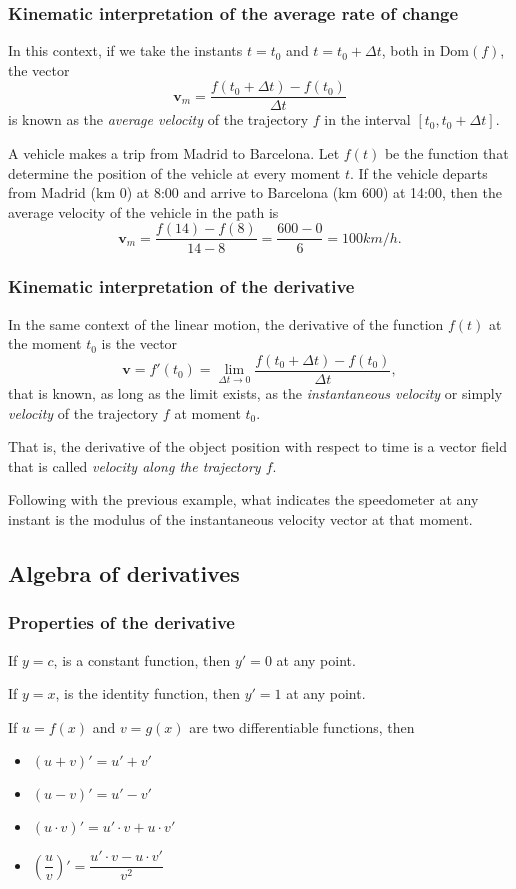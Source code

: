 \begin{frame}
\frametitle{Kinematic interpretation of the average rate of change}
In this context, if we take the instants $t=t_0$ and $t=t_0+\Delta t$, both in $\mbox{Dom}(f)$, the vector
\[
\mathbf{v}_m=\frac{f(t_0+\Delta t)-f(t_0)}{\Delta t}
\]
is known as the \emph{average velocity} of the trajectory $f$ in the interval $[t_0, t_0+\Delta t]$.

A vehicle makes a trip from Madrid to Barcelona.
Let $f(t)$ be the function that determine the position of the vehicle at every moment $t$.
If the vehicle departs from Madrid (km 0) at 8:00 and arrive to Barcelona (km 600) at 14:00, then the average velocity
of the vehicle in the path is
\[
\mathbf{v}_m=\frac{f(14)-f(8)}{14-8}=\frac{600-0}{6} = 100 km/h.
\]
\end{frame}


\begin{frame}
\frametitle{Kinematic interpretation of the derivative}
In the same context of the linear motion, the derivative of the function $f(t)$ at the moment $t_0$ is the vector
\[
\mathbf{v}=f'(t_0)=\lim_{\Delta t\rightarrow 0}\frac{f(t_0+\Delta t)-f(t_0)}{\Delta t},
\]
that is known, as long as the limit exists, as the \emph{instantaneous velocity} or simply \emph{velocity} of the trajectory $f$ at moment $t_0$.

That is, the derivative of the object position with respect to time is a vector field that is called \emph{velocity along the trajectory $f$}.

Following with the previous example, what indicates the speedometer at any instant is the modulus of the instantaneous velocity vector at that moment.
\end{frame}


\subsection{Algebra of derivatives}
\begin{frame}
\frametitle{Properties of the derivative}
If $y=c$, is a constant function, then $y'=0$ at any point.

If $y=x$, is the identity function, then  $y'=1$ at any point.

If $u=f(x)$ and $v=g(x)$ are two differentiable functions, then 
\begin{itemize}
\item $(u+v)'=u'+v'$
\item $(u-v)'=u'-v'$
\item $(u\cdot v)'=u'\cdot v+ u\cdot v'$
\item $\left(\dfrac{u}{v}\right)'=\dfrac{u'\cdot v-u\cdot v'}{v^2}$
\end{itemize}
\end{frame}


